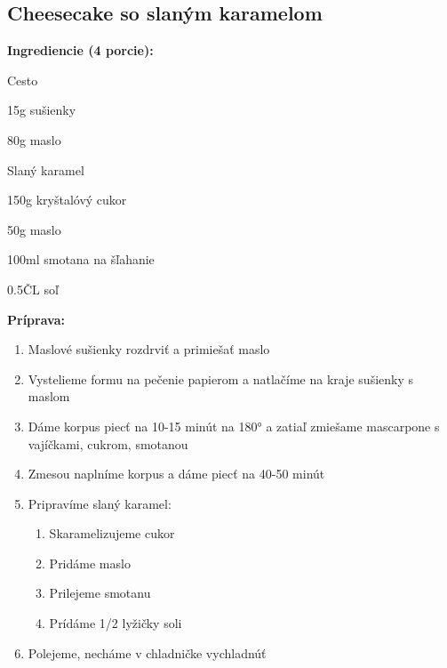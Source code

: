 \setcounter{step}{0}

\subsection{ Cheesecake so slaným karamelom }

\begin{ingredient}
  
  \def\portions{  }
  \textbf{ {\normalsize Ingrediencie (4 porcie):} }

  \begin{main}
      \item 
  \end{main}
  
    \begin{subingredient}{Cesto}
        \item 15g sušienky
        \item 80g maslo
    \end{subingredient}
  
    \begin{subingredient}{Slaný karamel}
        \item 150g kryštalóvý cukor
        \item 50g maslo
        \item 100ml smotana na šľahanie
        \item 0.5ČL soľ
    \end{subingredient}
  
\end{ingredient}
\begin{recipe}
\textbf{ {\normalsize Príprava:} }
\begin{enumerate}

  \item{Maslové sušienky rozdrviť a primiešať maslo}
  \item{Vystelieme formu na pečenie papierom a natlačíme na kraje sušienky s maslom}
  \item{Dáme korpus piecť na 10-15 minút na 180° a zatiaľ zmiešame mascarpone s vajíčkami, cukrom, smotanou}
  \item{Zmesou naplníme korpus a dáme piecť na 40-50 minút}
  \item{Pripravíme slaný karamel: }
      \begin{enumerate}
          \item{Skaramelizujeme cukor}
          \item{Pridáme maslo}
          \item{Prilejeme smotanu}
          \item{Prídáme 1/2 lyžičky soli}\end{enumerate}
  \item{Polejeme, necháme v chladničke vychladnúť}

\end{enumerate}
\end{recipe}

\begin{notes}
  
\end{notes}	
\clearpage
